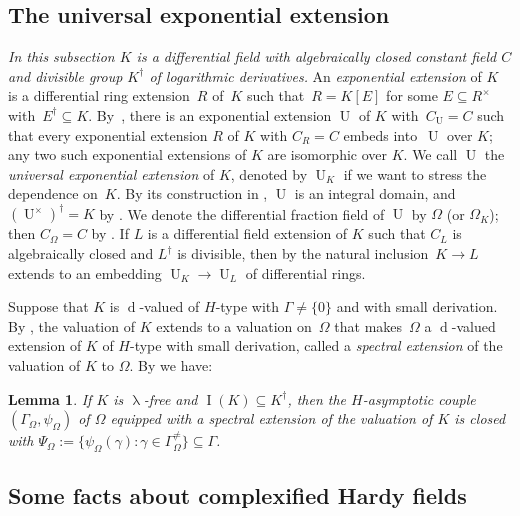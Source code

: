 \documentclass[]{amsart}
\numberwithin{equation}{section}
\def \I{\operatorname{I}}
\def \Univ {{\operatorname{U}}}
\def \d{\operatorname{d}}
\newtheorem{lemma}[theorem]{Lemma}
\theoremstyle{definition}
\theoremstyle{remark}
\def \upl{\uplambda}
\begin{document}
\subsection*{The universal exponential extension}
{\it In this subsection $K$ is a differential field with algebraically closed constant field $C$ and divisible group $K^\dagger$
 of logarithmic derivatives.}\/
An {\it exponential extension}\/ of $K$ is   a differential ring extension~$R$ of~$K$ such that~$R=K[E]$ for some $E\subseteq R^\times$ with~${E^\dagger\subseteq K}$.
By~\cite[Section~2.2, especially Corollary~2.2.11 and remarks preceding it]{ADH4},
there is an exponential extension $\Univ$ of $K$ with~$C_{\Univ}=C$ such that every exponential extension $R$ of $K$ with $C_R=C$
embeds into~$\Univ$ over $K$; any two such exponential extensions of $K$ are isomorphic over $K$.
We call $\Univ$ the {\it universal exponential extension}\/ of $K$,   denoted by $\Univ_K$ if we want to stress the dependence on~$K$.
By its construction in \cite[Section~2.2]{ADH4}, $\Univ$ is an integral domain,
and $(\Univ^\times)^\dagger =  K$ by \cite[remarks before Example~2.2.4]{ADH4}.
 We denote the differential fraction field of $\Univ$ by $\Omega$ (or $\Omega_K$); then   $C_\Omega=C$ by \cite[remark before Lemma~2.2.7]{ADH4}. 
If $L$ is a differential field extension of $K$ such that $C_L$ is algebraically closed and $L^\dagger$ is divisible, then
by \cite[Lemma~2.2.12]{ADH4} the natural inclusion~$K\to L$ extends to an embedding $\Univ_K\to\Univ_L$ of differential rings.


Suppose that $K$ is $\d$-valued of $H$-type with $\Gamma\neq\{0\}$ and with small derivation. 
By \cite[Lemma~2.5.1]{ADH4}, the  valuation of $K$ extends to a valuation on~$\Omega$ that makes~$\Omega$ a $\d$-valued extension of $K$ of $H$-type with small derivation, called a {\it spectral extension}\/
of the valuation of $K$ to $\Omega$.
By \cite[Lemma~2.5.3 and Corollary~2.5.5]{ADH4} we have:

\begin{lemma} \label{lem:as cpl Omega}
If $K$ is $\upl$-free and $\I(K)\subseteq K^\dagger$, then the $H$-asymptotic couple~$(\Gamma_\Omega,\psi_\Omega)$ of $\Omega$ equipped with a spectral
extension of the valuation of $K$ is closed  with $\Psi_\Omega:=\big\{ \psi_\Omega(\gamma):\gamma\in\Gamma_\Omega^{\neq}\big\}\subseteq\Gamma$.
\end{lemma}


\subsection*{Some facts about complexified Hardy fields}
\end{document}
